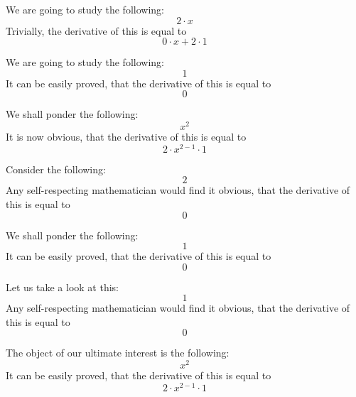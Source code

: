 \documentclass{article}
\begin{document}
We are going to study the following:
\begin{equation}
2 \cdot x 
\end{equation}
Trivially, the derivative of this is equal to
\begin{equation}
0 \cdot x + 2 \cdot 1 
\end{equation}

We are going to study the following:
\begin{equation}
1 
\end{equation}
It can be easily proved, that the derivative of this is equal to
\begin{equation}
0 
\end{equation}

We shall ponder the following:
\begin{equation}
x ^{2 } 
\end{equation}
It is now obvious, that the derivative of this is equal to
\begin{equation}
2 \cdot x ^{2 - 1 } \cdot 1 
\end{equation}

Consider the following:
\begin{equation}
2 
\end{equation}
Any self-respecting mathematician would find it obvious, that the derivative of this is equal to
\begin{equation}
0 
\end{equation}

We shall ponder the following:
\begin{equation}
1 
\end{equation}
It can be easily proved, that the derivative of this is equal to
\begin{equation}
0 
\end{equation}

Let us take a look at this:
\begin{equation}
1 
\end{equation}
Any self-respecting mathematician would find it obvious, that the derivative of this is equal to
\begin{equation}
0 
\end{equation}

The object of our ultimate interest is the following:
\begin{equation}
x ^{2 } 
\end{equation}
It can be easily proved, that the derivative of this is equal to
\begin{equation}
2 \cdot x ^{2 - 1 } \cdot 1 
\end{equation}
\end{document}
